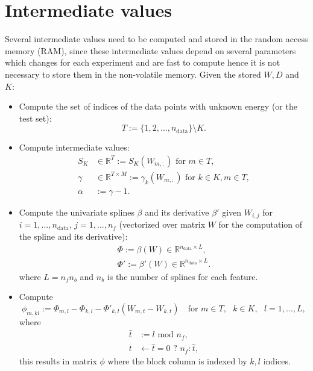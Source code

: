 \documentclass[12pt]{article}
\begin{document}
\section{Intermediate values}
\label{sec:intermediate}
Several intermediate values need to be computed and stored in the random access memory (RAM), since these intermediate values depend on several parameters which changes for each experiment and are fast to compute hence it is not necessary to store them in the non-volatile memory. Given the stored $W, D$ and $K$:
\begin{itemize}
	\item Compute the set of indices of the data points with unknown energy (or the test set):
	\begin{equation}
		T := \{1,2,...,n_\text{data}\} \setminus K.
	\end{equation}
	\item Compute intermediate values:
	\begin{equation}
		\label{eq:intermediate}
		\begin{split}
			S_K &\in \mathbb{R}^{T} := S_K(W_{m,:}) \text{ for } m \in T,\\
			\gamma &\in \mathbb{R}^{T \times M} := \gamma_k(W_{m,:}) \text{ for } k \in K, m \in T, \\
			\alpha &:= \gamma - 1.
		\end{split}
	\end{equation}
	\item Compute the univariate splines $\beta$ and its derivative $\beta'$ given $W_{i,j}$ for $i = 1,...,n_\text{data}$, $j = 1,...,n_f$ (vectorized over matrix $W$ for the computation of the spline and its derivative):
	\begin{equation}
		\begin{split}
			\Phi := \beta(W) \in \mathbb{R}^{n_\text{data} \times L}, \\
			\Phi' := \beta'(W) \in \mathbb{R}^{n_\text{data} \times L}.
		\end{split}
	\end{equation}
	where $L = n_fn_b$ and $n_b$ is the number of splines for each feature.
	\item Compute
	\begin{equation} %
		\phi_{m, kl} := \Phi_{m,l} - \Phi_{k,l} - \Phi'_{k,l}(W_{m,t}-W_{k,t}) \quad \text{for } m \in T, \text{ }k \in K, \text{ }l = 1,...,L,
	\end{equation}
	where
	\begin{equation}
		\begin{split}
			\hat{t} &:= l \text{ mod } n_f, \\
			t &\leftarrow \hat{t} = 0 \text{ ? } n_f : \hat{t},
		\end{split}
	\end{equation}
	this results in matrix $\phi$ where the block column is indexed by $k,l$ indices.
\end{itemize}
\end{document}
